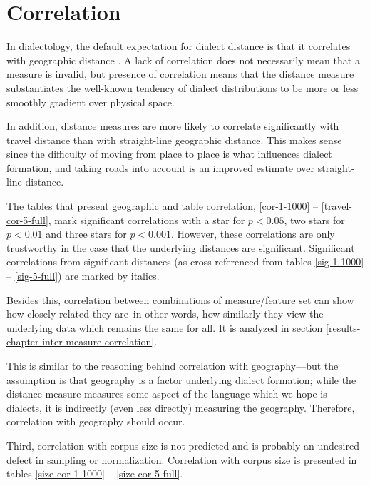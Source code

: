 \section{Correlation}
\label{section-correlation}

In dialectology, the default expectation for dialect distance is that
it correlates with geographic distance \cite{chambers98}. A lack of
correlation does not necessarily mean that a measure is invalid, but
presence of correlation means that the distance measure substantiates the
well-known tendency of dialect distributions to be more or less
smoothly gradient over physical space.

In addition, distance measures are more likely to correlate
significantly with travel distance than with straight-line geographic
distance. This makes sense since the difficulty of moving from place
to place is what influences dialect formation, and taking roads into
account is an improved estimate over straight-line distance.

The tables that present geographic and table correlation,
\ref{cor-1-1000} -- \ref{travel-cor-5-full}, mark significant
correlations with a star for $p < 0.05$, two stars for $p < 0.01$ and
three stars for $p < 0.001$. However, these correlations are only
trustworthy in the case that the underlying distances are
significant. Significant correlations from significant distances (as
cross-referenced from tables \ref{sig-1-1000} -- \ref{sig-5-full}) are
marked by italics.

Besides this, correlation between combinations of measure/feature set
can show how closely related they are--in other words, how similarly
they view the underlying data which remains the same for all. It is
analyzed in section \ref{results-chapter-inter-measure-correlation}.

This is similar to the reasoning behind correlation with
geography---but the assumption is that geography is a factor
underlying dialect formation; while the distance measure measures some
aspect of the language which we hope is dialects, it is indirectly
(even less directly) measuring the geography. Therefore, correlation
with geography should occur.

Third, correlation with corpus size is not predicted and is probably
an undesired defect in sampling or normalization. Correlation with
corpus size is presented in tables \ref{size-cor-1-1000} --
\ref{size-cor-5-full}.

